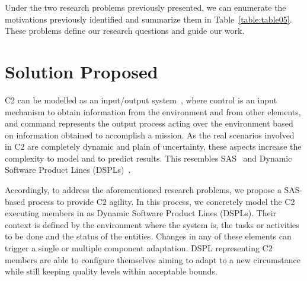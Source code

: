 \vspace{10}
\noindent{}
\vspace{10}

Under the two research problems previously presented, we can enumerate the motivations previously identified and summarize them in Table~\ref{table:table05}. These problems define our research questions and guide our work. 




\section{Solution Proposed} \label{sec:solutionIntro}

C2 can be modelled  as an input/output system~\cite{Alberts2006}, where control is an input mechanism to obtain information from the environment and from other elements, and command represents the output process acting over the environment based on information obtained to accomplish a mission. As the real scenarios involved in C2 are completely dynamic and plain of uncertainty, these aspects increase the complexity to model and to predict results. This resembles SAS~\cite{Hallsteinsen2012} and Dynamic Software Product Lines (DSPLs)~\cite{BencomoHA12}.

Accordingly, to address the aforementioned research problems, we propose a SAS-based process to provide C2 agility. In this process, we concretely model the C2 executing members in as Dynamic Software Product Lines (DSPLs). Their \gls{context} is defined by the environment where the system is, the tasks or activities to be done and the status of the entities. Changes in any of these elements can trigger a single or multiple component  adaptation. DSPL representing C2 members are able to configure themselves aiming to adapt to a new circumstance while still keeping quality levels within acceptable bounds.


